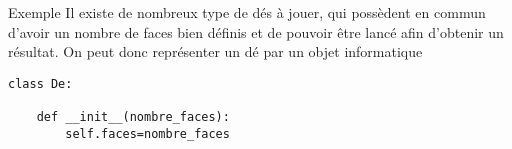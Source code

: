 \documentclass[10pt]{beamer}
\begin{document}
\begin{frame}[fragile]
\mframe{\POO}
\begin{exampleblock}{Exemple}
Il existe de nombreux type de dés à jouer, qui possèdent en commun d'avoir un nombre de faces bien définis et de pouvoir être lancé afin d'obtenir un résultat. On peut donc représenter un dé par un objet informatique
\begin{lstlisting}
class De:
	
	def __init__(nombre_faces):
		self.faces=nombre_faces
		
\end{lstlisting}
\end{exampleblock}
\end{frame}
\end{document}
